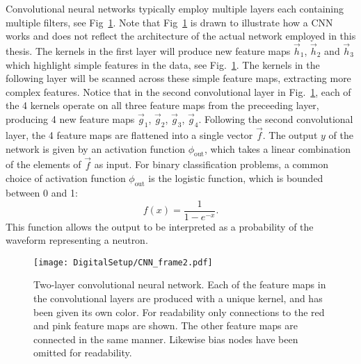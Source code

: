 \documentclass[main.tex]{subfiles}
\begin{document}
Convolutional neural networks typically employ multiple layers each containing multiple filters, see Fig~\ref{fig:CNN_frame2}. Note that Fig~\ref{fig:CNN_frame2} is drawn to illustrate how a CNN works and does not reflect the architecture of the actual network employed in this thesis.  The kernels in the first layer will produce new feature maps $\vec h_1$, $\vec h_2$ and $\vec h_3$ which highlight simple features in the data, see Fig.~\ref{fig:CNN_frame2}. The kernels in the following layer will be scanned across these simple feature maps, extracting more complex features. Notice that in the second convolutional layer in Fig.~\ref{fig:CNN_frame2}, each of the 4 kernels operate on all three feature maps from the preceeding layer, producing 4 new feature maps $\vec g_1$, $\vec g_2$, $\vec g_3$, $\vec g_4$. Following the second convolutional layer, the 4 feature maps are flattened into a single vector $\vec f$. The output $y$ of the network is given by an activation function $\phi_{\textrm{out}}$, which takes a linear combination of the elements of $\vec f$ as input. For binary classification problems, a common choice of activation function $\phi_{\textrm{out}}$ is the logistic function, which is bounded between 0 and 1:
\begin{equation}
	f(x) = \frac{1}{1-e^{-x}}.
\end{equation}
This function allows the output to be interpreted as a probability of the waveform representing a neutron.

\begin{figure}[ht!]
    \centering
        \texttt{[image: DigitalSetup/CNN\_frame2.pdf]}
        \caption[Two-layer convolutional neural network.]{Two-layer convolutional neural network. Each of the feature maps in the convolutional layers are produced with a unique kernel, and has been given its own color. For readability only connections to the red and pink feature maps are shown. The other feature maps are connected in the same manner. Likewise bias nodes have been omitted for readability.}
    \label{fig:CNN_frame2} 
\end{figure}
\end{document}
